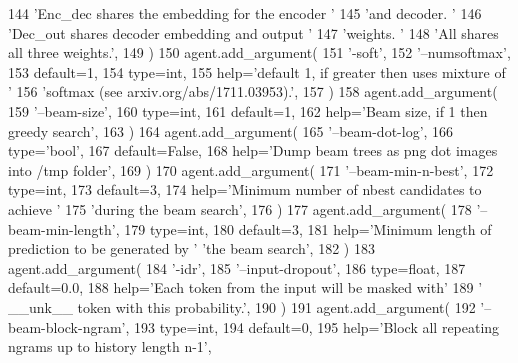 \begin{DoxyCode}
144             \textcolor{stringliteral}{'Enc\_dec shares the embedding for the encoder '}
145             \textcolor{stringliteral}{'and decoder. '}
146             \textcolor{stringliteral}{'Dec\_out shares decoder embedding and output '}
147             \textcolor{stringliteral}{'weights. '}
148             \textcolor{stringliteral}{'All shares all three weights.'},
149         )
150         agent.add\_argument(
151             \textcolor{stringliteral}{'-soft'},
152             \textcolor{stringliteral}{'--numsoftmax'},
153             default=1,
154             type=int,
155             help=\textcolor{stringliteral}{'default 1, if greater then uses mixture of '}
156             \textcolor{stringliteral}{'softmax (see arxiv.org/abs/1711.03953).'},
157         )
158         agent.add\_argument(
159             \textcolor{stringliteral}{'--beam-size'},
160             type=int,
161             default=1,
162             help=\textcolor{stringliteral}{'Beam size, if 1 then greedy search'},
163         )
164         agent.add\_argument(
165             \textcolor{stringliteral}{'--beam-dot-log'},
166             type=\textcolor{stringliteral}{'bool'},
167             default=\textcolor{keyword}{False},
168             help=\textcolor{stringliteral}{'Dump beam trees as png dot images into /tmp folder'},
169         )
170         agent.add\_argument(
171             \textcolor{stringliteral}{'--beam-min-n-best'},
172             type=int,
173             default=3,
174             help=\textcolor{stringliteral}{'Minimum number of nbest candidates to achieve '}
175             \textcolor{stringliteral}{'during the beam search'},
176         )
177         agent.add\_argument(
178             \textcolor{stringliteral}{'--beam-min-length'},
179             type=int,
180             default=3,
181             help=\textcolor{stringliteral}{'Minimum length of prediction to be generated by '} \textcolor{stringliteral}{'the beam search'},
182         )
183         agent.add\_argument(
184             \textcolor{stringliteral}{'-idr'},
185             \textcolor{stringliteral}{'--input-dropout'},
186             type=float,
187             default=0.0,
188             help=\textcolor{stringliteral}{'Each token from the input will be masked with'}
189             \textcolor{stringliteral}{' \_\_unk\_\_ token with this probability.'},
190         )
191         agent.add\_argument(
192             \textcolor{stringliteral}{'--beam-block-ngram'},
193             type=int,
194             default=0,
195             help=\textcolor{stringliteral}{'Block all repeating ngrams up to history length n-1'},

\end{DoxyCode}
